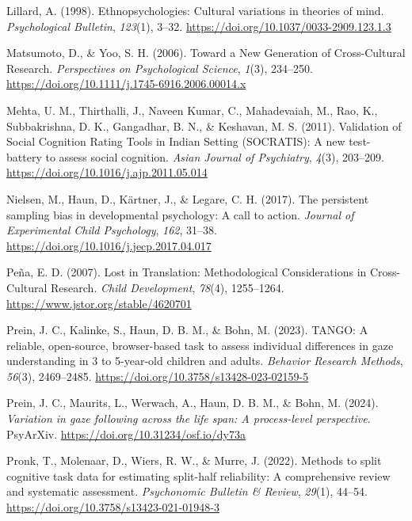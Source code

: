 \documentclass[
  man,floatsintext]{apa7}
\newlength{\cslhangindent}
\newenvironment{CSLReferences}[2] %
 {\begin{list}{}{%
  \setlength{\itemindent}{0pt}
  \setlength{\leftmargin}{0pt}
  \setlength{\parsep}{0pt}
  \ifodd #1
   \setlength{\leftmargin}{\cslhangindent}
   \setlength{\itemindent}{-1\cslhangindent}
  \fi
  \setlength{\itemsep}{#2\baselineskip}}}
 {\end{list}}
\begin{document}
\begin{CSLReferences}{1}{0}
Lillard, A. (1998). Ethnopsychologies: {Cultural} variations in theories of mind. \emph{Psychological Bulletin}, \emph{123}(1), 3--32. \url{https://doi.org/10.1037/0033-2909.123.1.3}

Matsumoto, D., \& Yoo, S. H. (2006). Toward a {New Generation} of {Cross-Cultural Research}. \emph{Perspectives on Psychological Science}, \emph{1}(3), 234--250. \url{https://doi.org/10.1111/j.1745-6916.2006.00014.x}

Mehta, U. M., Thirthalli, J., Naveen Kumar, C., Mahadevaiah, M., Rao, K., Subbakrishna, D. K., Gangadhar, B. N., \& Keshavan, M. S. (2011). Validation of {Social Cognition Rating Tools} in {Indian Setting} ({SOCRATIS}): {A} new test-battery to assess social cognition. \emph{Asian Journal of Psychiatry}, \emph{4}(3), 203--209. \url{https://doi.org/10.1016/j.ajp.2011.05.014}

Nielsen, M., Haun, D., Kärtner, J., \& Legare, C. H. (2017). The persistent sampling bias in developmental psychology: {A} call to action. \emph{Journal of Experimental Child Psychology}, \emph{162}, 31--38. \url{https://doi.org/10.1016/j.jecp.2017.04.017}

Peña, E. D. (2007). Lost in {Translation}: {Methodological Considerations} in {Cross-Cultural Research}. \emph{Child Development}, \emph{78}(4), 1255--1264. \url{https://www.jstor.org/stable/4620701}

Prein, J. C., Kalinke, S., Haun, D. B. M., \& Bohn, M. (2023). {TANGO}: {A} reliable, open-source, browser-based task to assess individual differences in gaze understanding in 3 to 5-year-old children and adults. \emph{Behavior Research Methods}, \emph{56}(3), 2469--2485. \url{https://doi.org/10.3758/s13428-023-02159-5}

Prein, J. C., Maurits, L., Werwach, A., Haun, D. B. M., \& Bohn, M. (2024). \emph{Variation in gaze following across the life span: {A} process-level perspective}. PsyArXiv. \url{https://doi.org/10.31234/osf.io/dy73a}

Pronk, T., Molenaar, D., Wiers, R. W., \& Murre, J. (2022). Methods to split cognitive task data for estimating split-half reliability: {A} comprehensive review and systematic assessment. \emph{Psychonomic Bulletin \& Review}, \emph{29}(1), 44--54. \url{https://doi.org/10.3758/s13423-021-01948-3}


\end{CSLReferences}
\end{document}
